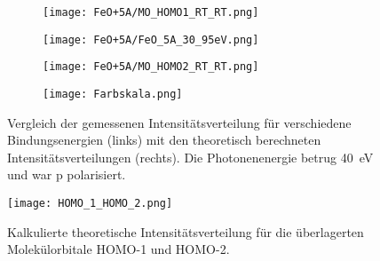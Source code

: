 \begin{figure}
\begin{subfigure}[t]{0.48\textwidth}
                \label{fig:MOT_FeO+5A_exp_3}
            \end{subfigure}
            \begin{subfigure}[t]{0.48\textwidth}
                \centering
                \texttt{[image: FeO+5A/MO\_HOMO1\_RT\_RT.png]}
                \label{fig:MOT_FeO+5A_theo_3}
            \end{subfigure}
            \centering
            \begin{subfigure}[t]{0.48\textwidth}
                \centering
                \texttt{[image: FeO+5A/FeO\_5A\_30\_95eV.png]}
                \label{fig:MOT_FeO+5A_exp_4}
            \end{subfigure}
            \begin{subfigure}[t]{0.48\textwidth}
                \centering
                \texttt{[image: FeO+5A/MO\_HOMO2\_RT\_RT.png]}
                \label{fig:MOT_FeO+5A_theo_4}
            \end{subfigure}
            \begin{subfigure}[t]{\textwidth}
                \centering
                \texttt{[image: Farbskala.png]}
            \end{subfigure}
            \caption{Vergleich der gemessenen Intensitätsverteilung für verschiedene Bindungsenergien (links) mit den theoretisch berechneten Intensitätsverteilungen (rechts).
            Die Photonenenergie betrug \SI{40}{\electronvolt} und war p polarisiert.}
            \label{fig:MOT_FeO_5A}
        \end{figure}
        \begin{figure}
            \centering
            \texttt{[image: HOMO\_1\_HOMO\_2.png]}
            \caption{Kalkulierte theoretische Intensitätsverteilung für die überlagerten Molekülorbitale HOMO-1 und HOMO-2.} %
            \label{fig:MOT_FeO+5A_theo_5}
        \end{figure}
